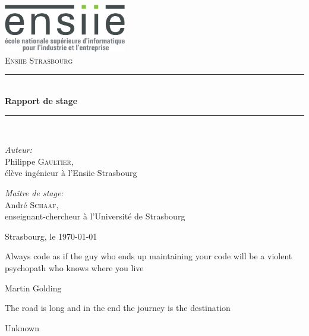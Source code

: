 \documentclass[a4paper,french,8pt]{article}
\newcommand{\HRule}{\rule{\linewidth}{0.5mm}}
\begin{document}
\begin{titlepage}
\begin{center}

\includegraphics[width=0.4\textwidth]{./logo_ENSIIE.png}~\\[1cm]
\textsc{\huge Ensiie Strasbourg}\\[1.5cm]

\HRule \\[0.4cm]
{
	\huge \bfseries Rapport de stage
\\[0.4cm] }
\HRule \\[1.5cm]

\begin{minipage}{0.4\textwidth}
\begin{flushleft} \huge
\emph{Auteur:}\\
Philippe \textsc{Gaultier},\\[0.5cm]
\Large élève ingénieur à l'Ensiie Strasbourg
\end{flushleft}
\end{minipage}
\begin{minipage}{0.4\textwidth}
\begin{flushright} \huge
\emph{Maître de stage:} \\
André \textsc{Schaaf},\\[0.5cm]
\Large enseignant-chercheur à l'Université de Strasbourg
\end{flushright}
\end{minipage}

\vfill

{\large Strasbourg, le \today}



\end{center}
\end{titlepage}

\newpage
{
  \centering
  {
    \vspace{3cm}
    \epigraph{Always code as if the guy who ends up maintaining your code will be a violent psychopath who knows where you live}{Martin Golding}
    \vspace{3cm}
    \epigraph{The road is long and in the end the journey is the destination}{Unknown}
  }
}
\newpage
\end{document}
